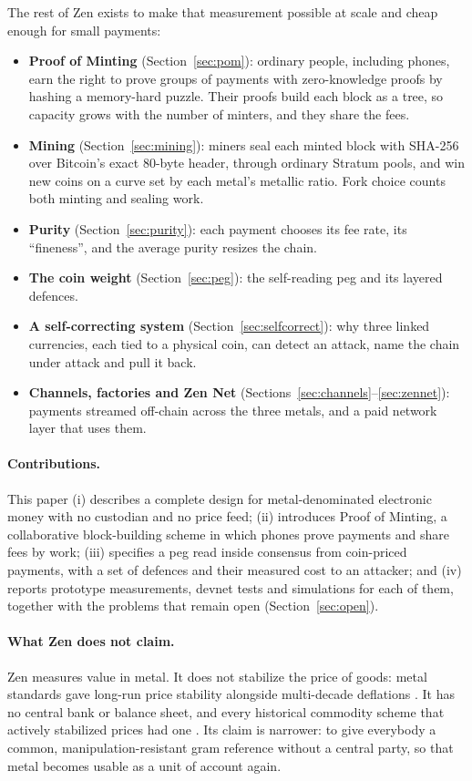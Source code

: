 The rest of Zen exists to make that measurement possible at scale and cheap enough for small payments:

\begin{itemize}
\item \textbf{Proof of Minting} (Section~\ref{sec:pom}): ordinary people, including phones, earn the right to prove groups of payments with zero-knowledge proofs by hashing a memory-hard puzzle. Their proofs build each block as a tree, so capacity grows with the number of minters, and they share the fees.
\item \textbf{Mining} (Section~\ref{sec:mining}): miners seal each minted block with SHA-256 over Bitcoin's exact 80-byte header, through ordinary Stratum pools, and win new coins on a curve set by each metal's metallic ratio. Fork choice counts both minting and sealing work.
\item \textbf{Purity} (Section~\ref{sec:purity}): each payment chooses its fee rate, its ``fineness'', and the average purity resizes the chain.
\item \textbf{The coin weight} (Section~\ref{sec:peg}): the self-reading peg and its layered defences.
\item \textbf{A self-correcting system} (Section~\ref{sec:selfcorrect}): why three linked currencies, each tied to a physical coin, can detect an attack, name the chain under attack and pull it back.
\item \textbf{Channels, factories and Zen Net} (Sections~\ref{sec:channels}--\ref{sec:zennet}): payments streamed off-chain across the three metals, and a paid network layer that uses them.
\end{itemize}

\paragraph{Contributions.} This paper (i) describes a complete design for metal-denominated electronic money with no custodian and no price feed; (ii) introduces Proof of Minting, a collaborative block-building scheme in which phones prove payments and share fees by work; (iii) specifies a peg read inside consensus from coin-priced payments, with a set of defences and their measured cost to an attacker; and (iv) reports prototype measurements, devnet tests and simulations for each of them, together with the problems that remain open (Section~\ref{sec:open}).

\paragraph{What Zen does not claim.} Zen measures value in metal. It does not stabilize the price of goods: metal standards gave long-run price stability alongside multi-decade deflations \cite{bordo,eichengreen}. It has no central bank or balance sheet, and every historical commodity scheme that actively stabilized prices had one \cite{bis2018,ussher}. Its claim is narrower: to give everybody a common, manipulation-resistant gram reference without a central party, so that metal becomes usable as a unit of account again.


